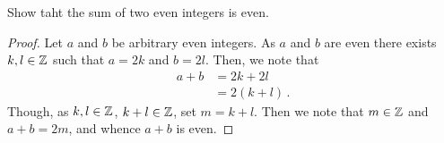 \guard



\begin{prop}
\label{prop:sumOfEvenIsEven}
  Show taht the sum of two even integers is even.
\end{prop}
\begin{proof}
  Let $a$ and $b$ be arbitrary even integers.
  As $a$ and $b$ are even there exists $k,l\in\mathbb{Z}$ such that $a=2k$ and $b=2l$.
  Then, we note that
  \begin{align*}
    a + b &= 2k + 2l \\
          &= 2( k + l )\,.
  \end{align*}
  Though, as $k,l\in\mathbb{Z}$, $k+l\in\mathbb{Z}$, set $m=k+l$.
  Then we note that $m\in\mathbb{Z}$ and $a+b = 2m$, and whence $a+b$ is even.
\end{proof}
